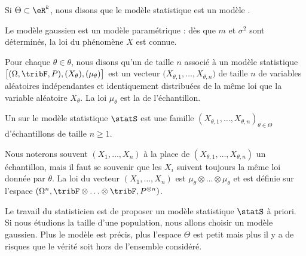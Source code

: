 \begin{definition}
    Si \( \Theta\subset\eR^k\), nous disons que le modèle statistique est un modèle .
\end{definition}
Le modèle gaussien est un modèle paramétrique : dès que \( m\) et \( \sigma^2\) sont déterminés, la loi du phénomène \( X\) est connue.

\begin{definition}
    Pour chaque \( \theta\in\theta\), nous disons qu'un  de taille \( n\) associé à un modèle statistique \( \big[ (\Omega,\tribF,P),(X_{\theta}),(\mu_{\theta}) \big]\) est un vecteur \( \big( X_{\theta,1},\ldots,X_{\theta,n} \big)\) de taille \( n\) de variables aléatoires indépendantes et identiquement distribuées de la même loi que la variable aléatoire \( X_{\theta}\). La loi \( \mu_{\theta}\) est la  de l'échantillon.
\end{definition}

\begin{definition}
    Un  sur le modèle statistique \( \statS\) est une famille \( (X_{\theta,1},\ldots, X_{\theta,n})_{\theta\in\Theta}\) d'échantillons de taille \( n\geq 1\).
\end{definition}

Nous noterons souvent \( (X_1,\ldots,X_n)\) à la place de \( (X_{\theta,1},\ldots,X_{\theta,n})\) un échantillon, mais il faut se souvenir que les \( X_i\) suivent toujours la même loi donnée par \( \theta\). La loi du vecteur \( (X_1,\ldots,X_n)\) est \( \mu_{\theta}\otimes\ldots\otimes\mu_{\theta}\) et est définie sur l'espace \( (\Omega^n,\tribF\otimes\ldots\otimes\tribF,P^{\otimes n})\).

\begin{remark}
    Le travail du statisticien est de proposer un modèle statistique \( \statS\) à priori. Si nous étudions la taille d'une population, nous allons choisir un modèle gaussien. Plus le modèle est précis, plus l'espace \( \Theta\) est petit mais plus il y a de risques que le vérité soit hors de l'ensemble considéré.
\end{remark}

